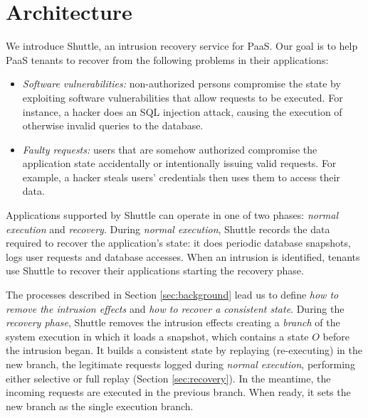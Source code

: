 
\section{Architecture}
\label{sec:architecture}

We introduce Shuttle, an intrusion recovery service for \ac{PaaS}. Our goal is to help \ac{PaaS} tenants to recover from the following problems in their applications:
\begin{itemize}
  \item \textit{Software vulnerabilities:} non-authorized persons compromise the state by exploiting software vulnerabilities that allow requests to be executed. For instance, a hacker does an SQL injection attack, causing the execution of otherwise invalid queries to the database.
  \item \textit{Faulty requests:} users that are somehow authorized compromise the application state accidentally or intentionally issuing valid requests. For example, a hacker steals users' credentials then uses them to access their data.
\end{itemize} 


Applications supported by Shuttle can operate in one of two phases: \textit{normal execution} and \textit{recovery}. During \emph{normal execution}, Shuttle records the data required to recover the application's state: it does periodic database snapshots, logs  user requests and database accesses. When an intrusion is identified, tenants use Shuttle to recover their applications starting the recovery phase.

The processes described in Section \ref{sec:background} lead us to define \textit{how to remove the intrusion effects} and \textit{how to recover a consistent state}. During the \emph{recovery phase}, Shuttle removes the intrusion effects creating a \textit{branch} of the system execution in which it loads a snapshot, which contains a state $O$ before the intrusion began. It builds a consistent state by replaying (re-executing) in the new branch, the legitimate requests logged during \emph{normal execution}, performing either selective or full replay (Section \ref{sec:recovery}). In the meantime, the incoming requests are executed in the previous branch. When ready, it sets the new branch as the single execution branch.

